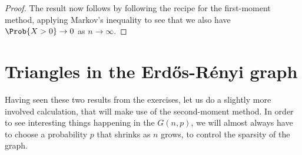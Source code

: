 \documentclass[nobib]{tufte-handout}
\begin{document}
\begin{proposition}
\begin{proof}
    The result now follows by following the recipe for the first-moment method, applying Markov's inequality to see that we also have $\Prob{X > 0} \to 0$ as $n \to \infty$.
  \end{proof}
\end{proposition}

\section{Triangles in the Erd\H{o}s-Rényi graph}

Having seen these two results from the exercises, let us do a slightly more involved calculation, that will make use of the second-moment method. In order to see interesting things happening in the $G(n,p)$, we will almost always have to choose a probability $p$ that shrinks as $n$ grows, to control the sparsity of the graph.
\end{document}
